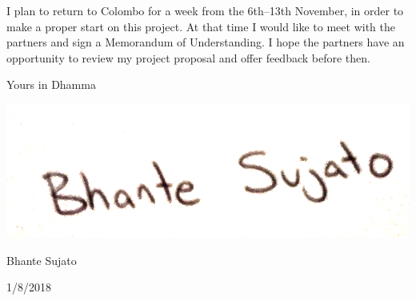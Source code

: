 \documentclass[11pt, openany,a4paper]{article}
\begin{document}
I plan to return to Colombo for a week from the 6th–13th November, in order to make a proper start on this project. At that time I would like to meet with the partners and sign a Memorandum of Understanding. I hope the partners have an opportunity to review my project proposal and offer feedback before then.

Yours in Dhamma

\includegraphics[width=.3\linewidth]{bhante-sujato.png}

Bhante Sujato

1/8/2018
\end{document}
